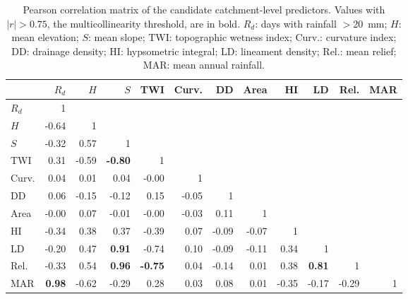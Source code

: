 \documentclass[journal abbreviation, manuscript]{copernicus}
\begin{document}
\begin{table}[h]
\caption{Pearson correlation matrix of the candidate catchment-level predictors. Values with $|r| > 0.75$, the multicollinearity threshold, are in bold. $R_d$: days with rainfall $>$20~mm; $H$: mean elevation; $S$: mean slope; TWI: topographic wetness index; Curv.: curvature index; DD: drainage density; HI: hypsometric integral; LD: lineament density; Rel.: mean relief; MAR: mean annual rainfall.}\label{tabA2}
\footnotesize
\begin{tabular}{@{}lrrrrrrrrrrr@{}}
\toprule
& $R_d$ & $H$ & $S$ & TWI & Curv. & DD & Area & HI & LD & Rel. & MAR \\
\midrule
$R_d$ & 1 &  &  &  &  &  &  &  &  &  &  \\
$H$ & -0.64 & 1 &  &  &  &  &  &  &  &  &  \\
$S$ & -0.32 & 0.57 & 1 &  &  &  &  &  &  &  &  \\
TWI & 0.31 & -0.59 & \textbf{-0.80} & 1 &  &  &  &  &  &  &  \\
Curv. & 0.04 & 0.01 & 0.04 & -0.00 & 1 &  &  &  &  &  &  \\
DD & 0.06 & -0.15 & -0.12 & 0.15 & -0.05 & 1 &  &  &  &  &  \\
Area & -0.00 & 0.07 & -0.01 & -0.00 & -0.03 & 0.11 & 1 &  &  &  &  \\
HI & -0.34 & 0.38 & 0.37 & -0.39 & 0.07 & -0.09 & -0.07 & 1 &  &  &  \\
LD & -0.20 & 0.47 & \textbf{0.91} & -0.74 & 0.10 & -0.09 & -0.11 & 0.34 & 1 &  &  \\
Rel. & -0.33 & 0.54 & \textbf{0.96} & \textbf{-0.75} & 0.04 & -0.14 & 0.01 & 0.38 & \textbf{0.81} & 1 &  \\
MAR & \textbf{0.98} & -0.62 & -0.29 & 0.28 & 0.03 & 0.08 & 0.01 & -0.35 & -0.17 & -0.29 & 1 \\
\bottomrule
\end{tabular}
\end{table}
\end{document}
